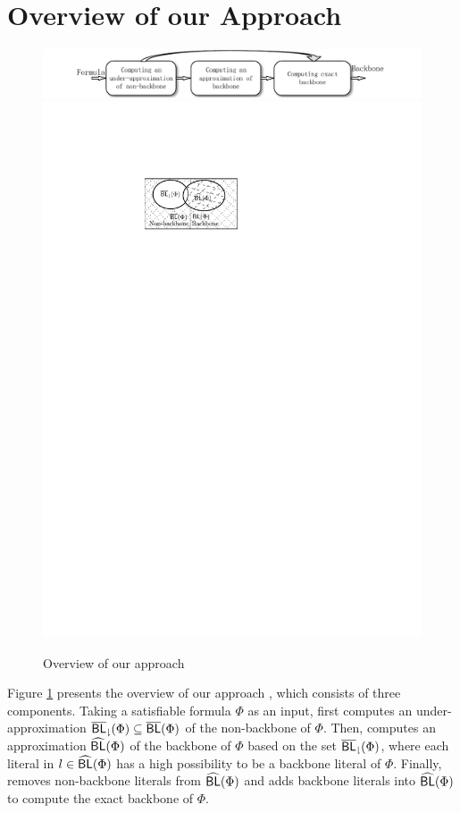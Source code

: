 \section{Overview of our Approach}\label{sec:walg}
\begin{figure}[t]
   \includegraphics[scale=0.75]{Framework}
  \hspace*{-15mm} \includegraphics[scale=0.75]{Fig-backbone}
   \caption{Overview of our approach}
   \label{flow}
\end{figure} 

Figure \ref{flow} presents the overview of our approach \tool, which consists of three components. Taking a satisfiable formula
$\Phi$ as an input, \tool first computes an under-approximation ${\sf \overline{BL}_\downharpoonright}(\Phi)\subseteq \overline{\textsf{BL}}(\Phi)$ of the non-backbone of
$\Phi$. Then, \tool computes an approximation ${\sf \widehat{BL}}(\Phi)$ of the backbone of $\Phi$ based on the set ${\sf \overline{BL}_\downharpoonright}(\Phi)$, where each literal in $l\in {\sf \widehat{BL}}(\Phi)$ has a high possibility to be a backbone literal of $\Phi$.
Finally, \tool removes non-backbone literals from ${\sf \widehat{BL}}(\Phi)$ and adds backbone literals into ${\sf \widehat{BL}}(\Phi)$ to compute the exact backbone of $\Phi$.

